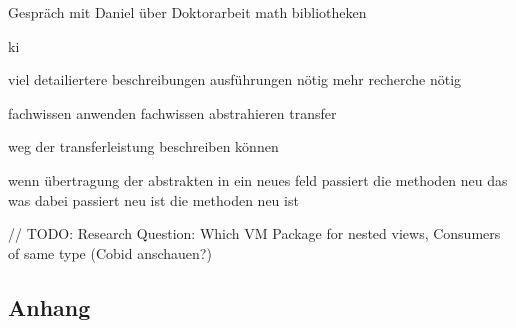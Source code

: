 \documentclass[12pt, twoside]{article}
\begin{document}
Gespräch mit Daniel über Doktorarbeit
math bibliotheken

ki

viel detailiertere beschreibungen ausführungen nötig
mehr recherche nötig



fachwissen anwenden
fachwissen abstrahieren
	transfer

	weg der transferleistung beschreiben können


wenn übertragung der abstrakten in ein neues feld passiert
	die methoden neu
	das was dabei passiert neu ist
		die methoden neu ist

// TODO: Research Question: Which VM Package for nested views, Consumers of same type (Cobid anschauen?)


\begin{appendix} 
  \section*{Anhang} 
  \renewcommand{\thesubsection}{\Alph{subsection}}
 

\end{appendix} 

\printbibliography{}

 

% 
% 
\end{document}

